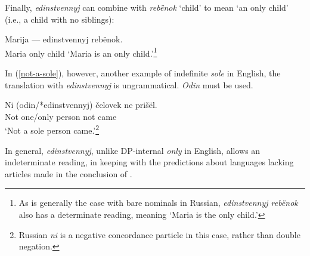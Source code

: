 Finally, \textit{edinstvennyj} can combine with \textit{reb\"{e}nok} `child' to mean `an only child' (i.e., a child with no siblings):

\begin{exe}
	\ex \label{only-child-ru} Marija --- edinstvennyj reb\"{e}nok.\\
	Maria {} only child
	\glt `Maria is an only child.'\footnote{As is generally the case with bare nominals in Russian, \textit{edinstvennyj reb\"{e}nok} also has a determinate reading, meaning `Maria is the only child.'}
\end{exe}

In (\ref{not-a-sole}), however, another example of indefinite \textit{sole} in English, the translation with \textit{edinstvennyj} is ungrammatical. \textit{Odin} must be used.

\begin{exe}
	\ex \label{not-a-sole} \gll Ni (odin/*edinstvennyj) \v{c}elovek ne pri\v{s}\"{e}l.\\
	Not one/only person not came\\
	\glt `Not a sole person came.'\footnote{Russian \textit{ni} is a negative concordance particle in this case, rather than double negation.}
\end{exe}

In general, \textit{edinstvennyj}, unlike DP-internal \textit{only} in English, allows an indeterminate reading, in keeping with the predictions about languages lacking articles made in the conclusion of \citet{cb2015}.
